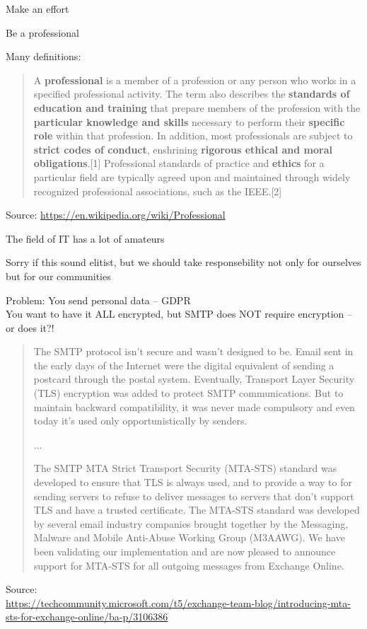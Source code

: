 \documentclass[Screen16to9,17pt]{foils}
\begin{document}
\begin{list2}
\item Make an effort
\item Be a professional
\end{list2}

Many definitions:
\begin{quote}
A {\bf professional} is a member of a profession or any person who works in a specified professional activity. The term also describes the {\bf standards of education and training} that prepare members of the profession with the {\bf particular knowledge and skills} necessary to perform their {\bf specific role} within that profession. In addition, most professionals are subject to {\bf strict codes of conduct}, enshrining {\bf rigorous ethical and moral obligations}.[1] Professional standards of practice and {\bf ethics} for a particular field are typically agreed upon and maintained through widely recognized professional associations, such as the IEEE.[2]
\end{quote}
Source: \url{https://en.wikipedia.org/wiki/Professional}

\begin{list2}
\item The field of IT has a lot of amateurs
\item Sorry if this sound elitist, but we should take responsebility not only for ourselves but for our communities
\end{list2}


Problem: You send personal data -- GDPR\\
You want to have it ALL encrypted, but SMTP does NOT require encryption -- or does it?!

\vskip 1cm

\begin{quote}\footnotesize
The SMTP protocol isn’t secure and wasn’t designed to be. Email sent in the early days of the Internet were the digital equivalent of sending a postcard through the postal system. Eventually, Transport Layer Security (TLS) encryption was added to protect SMTP communications. But to maintain backward compatibility, it was never made compulsory and even today it’s used only opportunistically by senders.

...

The SMTP MTA Strict Transport Security (MTA-STS) standard was developed to ensure that TLS is always used, and to provide a way to for sending servers to refuse to deliver messages to servers that don’t support TLS and have a trusted certificate. The MTA-STS standard was developed by several email industry companies brought together by the Messaging, Malware and Mobile Anti-Abuse Working Group (M3AAWG). We have been validating our implementation and are now pleased to announce support for MTA-STS for all outgoing messages from Exchange Online.
\end{quote}
Source:\\
 {\scriptsize\url{https://techcommunity.microsoft.com/t5/exchange-team-blog/introducing-mta-sts-for-exchange-online/ba-p/3106386}}
\end{document}
